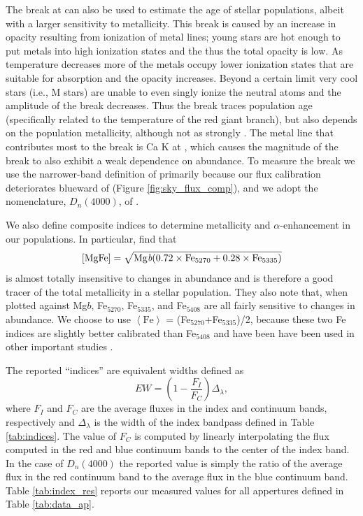 The break at  can also be used to estimate the age of
stellar populations, albeit with a larger sensitivity to
metallicity. This break is caused by an increase in opacity resulting
from ionization of metal lines; young stars are hot enough to put
metals into high ionization states and the thus the total opacity is
low. As temperature decreases more of the metals occupy lower
ionization states that are suitable for absorption and the opacity
increases. Beyond a certain limit very cool stars (i.e., M stars) are
unable to even singly ionize the neutral atoms and the amplitude of
the break decreases. Thus the  break traces population
age (specifically related to the temperature of the red giant branch),
but also depends on the population metallicity, although not as
strongly \citep[see][and Figure \ref{fig:D4000_cuts} here]{Bruzual83}.
The metal line that contributes most to the  break is
Ca K at , which causes the magnitude of the break to
also exhibit a weak dependence on abundance. To measure the
 break we use the narrower-band definition of
\citet{Balogh99} primarily because our flux calibration deteriorates
blueward of  (Figure \ref{fig:sky_flux_comp}), and we
adopt the nomenclature, $D_n(4000)$, of \citet{Kauffmann03}.

We also define composite indices to determine metallicity and
$\alpha$-enhancement in our populations. In particular,
\citet{Thomas03} find that 
\begin{equation}
\mathrm{[MgFe]} = \sqrt{\mathrm{Mg
    \emph{b}}(0.72\times\mathrm{Fe}_{5270} +
  0.28\times\mathrm{Fe}_{5335})}
\end{equation}
is almost totally insensitive to changes in abundance and is therefore
a good tracer of the total metallicity in a stellar population. They
also note that, when plotted against Mg$b$, Fe$_{5270}$, Fe$_{5335}$,
and Fe$_{5408}$ are all fairly sensitive to changes in abundance. We
choose to use $\left<\mathrm{Fe}\right>$ =
(Fe$_{5270}$+Fe$_{5335}$)/2, because these two Fe indices are slightly
better calibrated than Fe$_{5408}$ \citep{Thomas03} and have been have
been used in other important studies
\citep[e.g.,][]{Trager05,Trager08,Trager09}.

The reported ``indices'' are equivalent widths defined as
\begin{equation}
  EW = \left(1 - \frac{F_I}{F_C}\right)\Delta_{\lambda},
\end{equation}
where $F_I$ and $F_C$ are the average fluxes in the index and
continuum bands, respectively and $\Delta_{\lambda}$ is the width of
the index bandpass defined in Table \ref{tab:indices}. The value of
$F_C$ is computed by linearly interpolating the flux computed in the
red and blue continuum bands to the center of the index band. In the
case of $D_n(4000)$ the reported value is simply the ratio of the
average flux in the red continuum band to the average flux in the blue
continuum band. Table \ref{tab:index_res} reports our measured values
for all appertures defined in Table \ref{tab:data_ap}.

